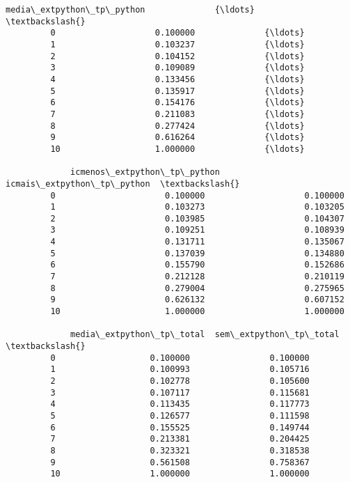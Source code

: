 \documentclass[11pt]{article}
\begin{document}
\begin{Verbatim}[commandchars=\\\{\}]
             media\_extpython\_tp\_python              {\ldots}               \textbackslash{}
         0                    0.100000              {\ldots}                
         1                    0.103237              {\ldots}                
         2                    0.104152              {\ldots}                
         3                    0.109089              {\ldots}                
         4                    0.133456              {\ldots}                
         5                    0.135917              {\ldots}                
         6                    0.154176              {\ldots}                
         7                    0.211083              {\ldots}                
         8                    0.277424              {\ldots}                
         9                    0.616264              {\ldots}                
         10                   1.000000              {\ldots}                
         
             icmenos\_extpython\_tp\_python  icmais\_extpython\_tp\_python  \textbackslash{}
         0                      0.100000                    0.100000   
         1                      0.103273                    0.103205   
         2                      0.103985                    0.104307   
         3                      0.109251                    0.108939   
         4                      0.131711                    0.135067   
         5                      0.137039                    0.134880   
         6                      0.155790                    0.152686   
         7                      0.212128                    0.210119   
         8                      0.279004                    0.275965   
         9                      0.626132                    0.607152   
         10                     1.000000                    1.000000   
         
             media\_extpython\_tp\_total  sem\_extpython\_tp\_total  \textbackslash{}
         0                   0.100000                0.100000   
         1                   0.100993                0.105716   
         2                   0.102778                0.105600   
         3                   0.107117                0.115681   
         4                   0.113435                0.117773   
         5                   0.126577                0.111598   
         6                   0.155525                0.149744   
         7                   0.213381                0.204425   
         8                   0.323321                0.318538   
         9                   0.561508                0.758367   
         10                  1.000000                1.000000   
         

\end{Verbatim}
\end{document}
